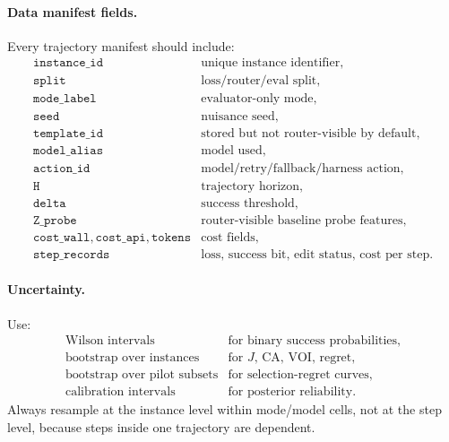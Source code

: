 \documentclass{article}
\begin{document}
\paragraph{Data manifest fields.}
Every trajectory manifest should include:
\[
\begin{array}{ll}
    \texttt{instance\_id} & \text{unique instance identifier},\\
    \texttt{split} & \text{loss/router/eval split},\\
    \texttt{mode\_label} & \text{evaluator-only mode},\\
    \texttt{seed} & \text{nuisance seed},\\
    \texttt{template\_id} & \text{stored but not router-visible by default},\\
    \texttt{model\_alias} & \text{model used},\\
    \texttt{action\_id} & \text{model/retry/fallback/harness action},\\
    \texttt{H} & \text{trajectory horizon},\\
    \texttt{delta} & \text{success threshold},\\
    \texttt{Z\_probe} & \text{router-visible baseline probe features},\\
    \texttt{cost\_wall},\texttt{cost\_api},\texttt{tokens} & \text{cost fields},\\
    \texttt{step\_records} & \text{loss, success bit, edit status, cost per step}.
\end{array}
\]

\paragraph{Uncertainty.}
Use:
\[
\begin{array}{ll}
    \text{Wilson intervals} & \text{for binary success probabilities},\\
    \text{bootstrap over instances} & \text{for \(J\), \(\mathrm{CA}\), \(\mathrm{VOI}\), regret},\\
    \text{bootstrap over pilot subsets} & \text{for selection-regret curves},\\
    \text{calibration intervals} & \text{for posterior reliability}.
\end{array}
\]
Always resample at the instance level within mode/model cells, not at the step level, because
steps inside one trajectory are dependent.
\end{document}
